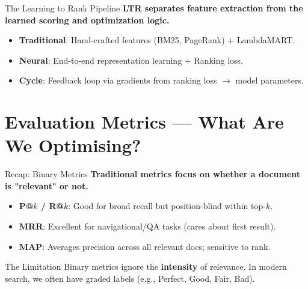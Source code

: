 \documentclass[aspectratio=169]{beamer}
\newif\ifanimated
\newcommand{\cpause}{\ifanimated\pause\fi}
\begin{document}
\begin{frame}{The Learning to Rank Pipeline}
\textbf{LTR separates feature extraction from the learned scoring and optimization logic.}

\vspace{0.8em}
\begin{itemize}
    \item \textbf{Traditional}: Hand-crafted features (BM25, PageRank) + LambdaMART.
    \item \textbf{Neural}: End-to-end representation learning + Ranking loss.
    \item \textbf{Cycle}: Feedback loop via gradients from ranking loss $\to$ model parameters.
\end{itemize}\cpause

\vspace{0.5em}
\begin{center}

\end{center}
\end{frame}

\section{Evaluation Metrics --- What Are We Optimising?}

\begin{frame}[plain]
\sectionpage
\end{frame}

\begin{frame}{Recap: Binary Metrics}
\textbf{Traditional metrics focus on whether a document is "relevant" or not.}

\vspace{0.8em}
\begin{itemize}
    \item \textbf{P@$k$ / R@$k$}: Good for broad recall but position-blind within top-$k$.
    \item \textbf{MRR}: Excellent for navigational/QA tasks (cares about first result).
    \item \textbf{MAP}: Averages precision across all relevant docs; sensitive to rank.
\end{itemize}\cpause

\vspace{1em}
\cpause
\begin{alertblock}{The Limitation}
Binary metrics ignore the \textbf{intensity} of relevance. In modern search, we often have graded labels (e.g., Perfect, Good, Fair, Bad).
\end{alertblock}
\end{frame}
\end{document}
